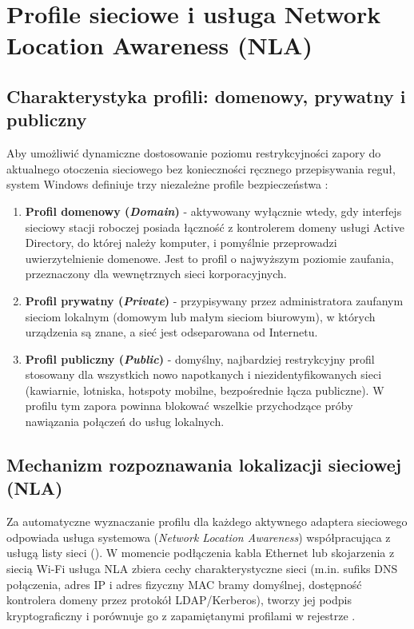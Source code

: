 \section{Profile sieciowe i usługa Network Location Awareness (NLA)}\label{sec:profile-sieciowe}

\subsection{Charakterystyka profili: domenowy, prywatny i publiczny}\label{subsec:charakterystyka-profili}

Aby umożliwić dynamiczne dostosowanie poziomu restrykcyjności zapory do aktualnego otoczenia sieciowego bez konieczności ręcznego przepisywania reguł, system Windows definiuje trzy niezależne profile bezpieczeństwa \cite{ms-defender-firewall}:
\begin{enumerate}
    \item \textbf{Profil domenowy (\textit{Domain})} - aktywowany wyłącznie wtedy, gdy interfejs sieciowy stacji roboczej posiada łączność z kontrolerem domeny usługi Active Directory, do której należy komputer, i pomyślnie przeprowadzi uwierzytelnienie domenowe. Jest to profil o najwyższym poziomie zaufania, przeznaczony dla wewnętrznych sieci korporacyjnych.
    \item \textbf{Profil prywatny (\textit{Private})} - przypisywany przez administratora zaufanym sieciom lokalnym (domowym lub małym sieciom biurowym), w których urządzenia są znane, a sieć jest odseparowana od Internetu.
    \item \textbf{Profil publiczny (\textit{Public})} - domyślny, najbardziej restrykcyjny profil stosowany dla wszystkich nowo napotkanych i niezidentyfikowanych sieci (kawiarnie, lotniska, hotspoty mobilne, bezpośrednie łącza publiczne). W profilu tym zapora powinna blokować wszelkie przychodzące próby nawiązania połączeń do usług lokalnych.
\end{enumerate}

\subsection{Mechanizm rozpoznawania lokalizacji sieciowej (NLA)}\label{subsec:mechanizm-nla}

Za automatyczne wyznaczanie profilu dla każdego aktywnego adaptera sieciowego odpowiada usługa systemowa  (\textit{Network Location Awareness}) współpracująca z usługą listy sieci (). W momencie podłączenia kabla Ethernet lub skojarzenia z siecią Wi-Fi usługa NLA zbiera cechy charakterystyczne sieci (m.in. sufiks DNS połączenia, adres IP i adres fizyczny MAC bramy domyślnej, dostępność kontrolera domeny przez protokół LDAP/Kerberos), tworzy jej podpis kryptograficzny i porównuje go z zapamiętanymi profilami w rejestrze .

